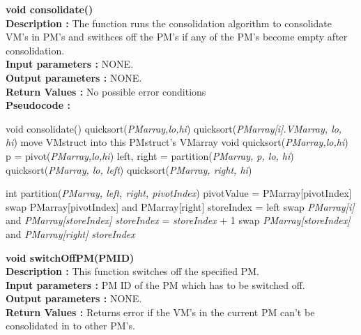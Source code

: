 \documentclass[a4paper,11pt]{article}
\begin{document}
\textbf{ void consolidate()}
\\
\textbf{Description :} The function runs the consolidation algorithm to consolidate VM's in PM's and swithces 
off the PM's if any of the PM's become empty after consolidation.
\\
\textbf{Input parameters :} NONE.
\\
\textbf{Output parameters :} NONE.
\\
\textbf{Return Values :} No possible error conditions
\\
\textbf{Pseudocode :}
\begin{algorithmic}[1]
\STATE void consolidate()
\STATE quicksort(\emph{PMarray,lo,hi}) 
\STATE quicksort(\emph{PMarray[i].VMarray, lo, hi}) 
\STATE move VMstruct into this PMstruct's VMarray
\ENDIF
\ENDFOR
\ENDFOR
\ENDFOR
\STATE void quicksort(\emph{PMarray,lo,hi})
\STATE p = pivot(\emph{PMarray,lo,hi})
\STATE left, right = partition(\emph{PMarray, p, lo, hi})
\STATE quicksort(\emph{PMarray, lo, left})
\STATE quicksort(\emph{PMarray, right, hi})
\ENDIF
\end{algorithmic}
\begin{algorithmic}[1]
\STATE int partition(\emph{PMarray, left, right, pivotIndex})
\STATE pivotValue = PMarray[pivotIndex]
\STATE swap PMarray[pivotIndex] and PMarray[right]
\STATE storeIndex = left
\STATE swap \emph{PMarray[i]} and \emph{PMarray[storeIndex]}
\STATE \emph{storeIndex} = \emph{storeIndex} + 1
\ENDIF
\STATE swap \emph{PMarray[storeIndex]} and \emph{PMarray[right]}
\ENDFOR
\RETURN \emph{storeIndex}
\end{algorithmic}
\textbf{ void switchOffPM(PM\textunderscore ID)}
\\
\textbf{Description :} This function switches off the specified PM.
\\
\textbf{Input parameters :} PM ID of the PM which has to be switched off.
\\
\textbf{Output parameters :} NONE.
\\
\textbf{Return Values :} Returns error if the VM's in the current PM can't be consolidated in to other PM's.
\end{document}
